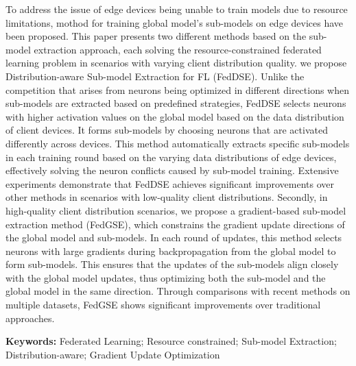 To address the issue of edge devices being unable to train models due to resource limitations,
mothod for training global model's sub-models on edge devices have been proposed.
This paper presents two different methods based on the sub-model extraction approach,
each solving the resource-constrained federated learning problem in scenarios with varying client distribution quality.
we propose Distribution-aware Sub-model Extraction for FL (FedDSE).
Unlike the competition that arises from neurons being optimized in different directions when sub-models are extracted based on predefined strategies,
FedDSE selects neurons with higher activation values on the global model based on the data distribution of client devices.
It forms sub-models by choosing neurons that are activated differently across devices.
This method automatically extracts specific sub-models in each training round based on the varying data distributions of edge devices, 
effectively solving the neuron conflicts caused by sub-model training. 
Extensive experiments demonstrate that FedDSE achieves significant improvements over other methods in scenarios with low-quality client distributions.
Secondly, in high-quality client distribution scenarios, we propose a gradient-based sub-model extraction method (FedGSE), 
which constrains the gradient update directions of the global model and sub-models. 
In each round of updates, this method selects neurons with large gradients during backpropagation from the global model to form sub-models.
This ensures that the updates of the sub-models align closely with the global model updates, 
thus optimizing both the sub-model and the global model in the same direction.
Through comparisons with recent methods on multiple datasets, FedGSE shows significant improvements over traditional approaches.


\textbf{Keywords:} Federated Learning; Resource constrained; 
Sub-model Extraction; Distribution-aware; Gradient Update Optimization